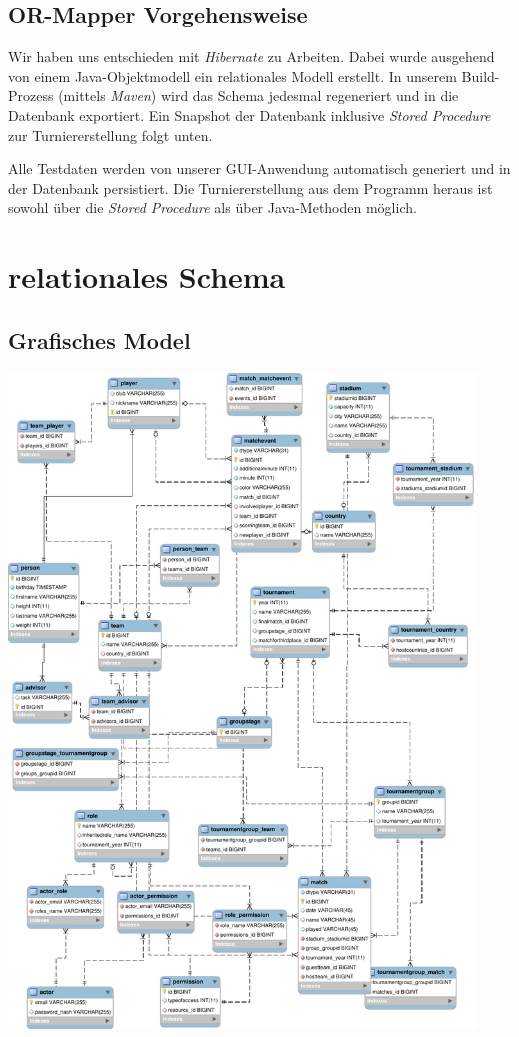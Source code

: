 \documentclass[11pt,german]{scrartcl}
\begin{document}
\subsection*{OR-Mapper Vorgehensweise}
Wir haben uns entschieden mit \emph{Hibernate} zu Arbeiten. Dabei wurde ausgehend von einem Java-Objektmodell ein relationales Modell erstellt. In unserem Build-Prozess (mittels \emph{Maven}) wird das Schema jedesmal regeneriert und in die Datenbank exportiert. Ein Snapshot der Datenbank inklusive \emph{Stored Procedure} zur Turniererstellung folgt unten.

Alle Testdaten werden von unserer GUI-Anwendung automatisch generiert und in der Datenbank persistiert. Die Turniererstellung  aus dem Programm heraus ist sowohl über die \emph{Stored Procedure} als über Java-Methoden möglich.

\section*{relationales Schema}
\subsection*{Grafisches Model}
\begin{center}
\leavevmode
\includegraphics[width=0.93\textwidth]{../diagrams/relationales_schema.pdf}
\end{center}
\end{document}
